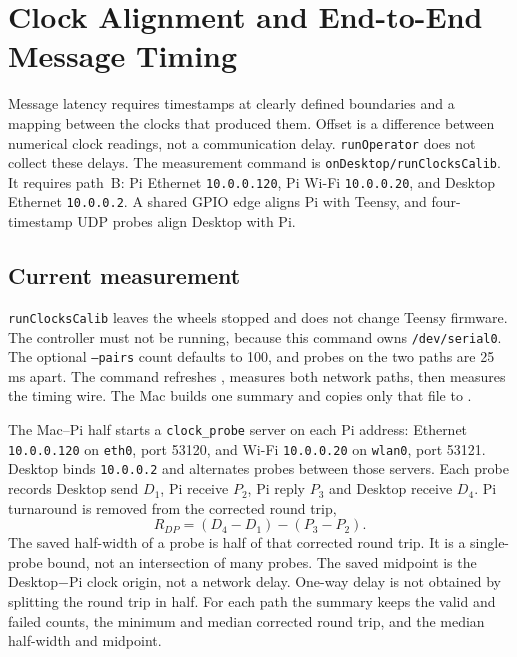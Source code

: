 \clearpage
\section{Clock Alignment and End-to-End Message Timing}
\label{sec:gpio-clock}
Message latency requires timestamps at clearly defined boundaries and a mapping between the clocks that produced them. Offset is a difference between numerical clock readings, not a communication delay. \texttt{runOperator} does not collect these delays. The measurement command is \texttt{onDesktop/runClocksCalib}. It requires path~B: Pi Ethernet \texttt{10.0.0.120}, Pi Wi-Fi \texttt{10.0.0.20}, and Desktop Ethernet \texttt{10.0.0.2}. A shared GPIO edge aligns Pi with Teensy, and four-timestamp UDP probes align Desktop with Pi.

\subsection{Current measurement}
\label{sec:clock-method}
\texttt{runClocksCalib} leaves the wheels stopped and does not change Teensy firmware. The controller must not be running, because this command owns \texttt{/dev/serial0}. The optional \texttt{--pairs} count defaults to 100, and probes on the two paths are 25\,ms apart. The command refreshes , measures both network paths, then measures the timing wire. The Mac builds one summary and copies only that file to .

The Mac--Pi half starts a \texttt{clock\_probe} server on each Pi address: Ethernet \texttt{10.0.0.120} on \texttt{eth0}, port 53120, and Wi-Fi \texttt{10.0.0.20} on \texttt{wlan0}, port 53121. Desktop binds \texttt{10.0.0.2} and alternates probes between those servers. Each probe records Desktop send $D_1$, Pi receive $P_2$, Pi reply $P_3$ and Desktop receive $D_4$. Pi turnaround is removed from the corrected round trip,
\begin{equation}
R_{DP}=(D_4-D_1)-(P_3-P_2).
\label{eq:clock-corrected-rtt}
\end{equation}
The saved half-width of a probe is half of that corrected round trip. It is a single-probe bound, not an intersection of many probes. The saved midpoint is the Desktop$-$Pi clock origin, not a network delay. One-way delay is not obtained by splitting the round trip in half. For each path the summary keeps the valid and failed counts, the minimum and median corrected round trip, and the median half-width and midpoint.

